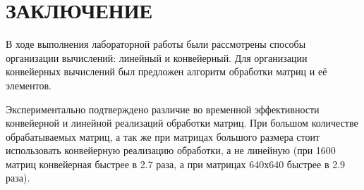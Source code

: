 \part*{ЗАКЛЮЧЕНИЕ}

В ходе выполнения лабораторной работы были рассмотрены способы организации вычислений: линейный и конвейерный. Для организации конвейерных вычислений был предложен алгоритм обработки матриц и её элементов.

Экспериментально подтверждено различие во временной эффективности конвейерной и линейной реализаций обработки матриц. При большом количестве обрабатываемых матриц, а так же при матрицах большого размера стоит использовать конвейерную реализацию обработки, а не линейную (при 1600 матриц конвейерная быстрее в 2.7 раза, а при матрицах 640х640 быстрее в 2.9 раза).